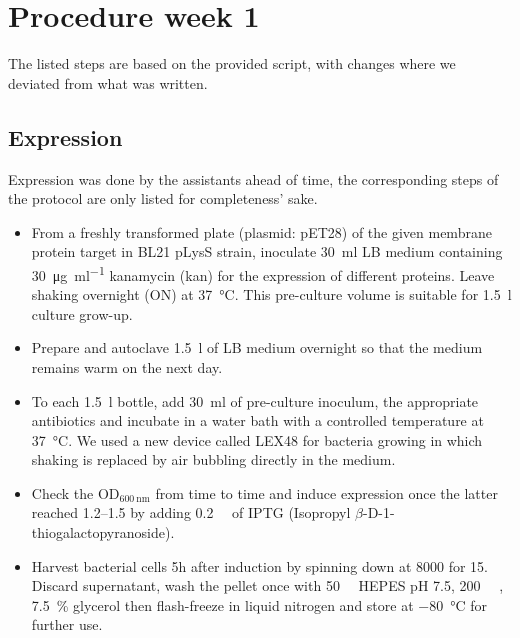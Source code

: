 \chapter{Procedure week 1\cite{skript_ballmoos}}

The listed steps are based on the provided script, with changes where we
deviated from what was written.

\section{Expression}

Expression was done by the assistants ahead of time, the corresponding steps of
the protocol are only listed for completeness' sake.

\begin{itemize}
	\item From a freshly transformed plate (plasmid: pET28) of the given
		membrane protein target in BL21 pLysS strain, inoculate
		\SI{30}{\ml} LB medium containing \SI{30}{\ug \per \ml}
		kanamycin (kan) for the expression of different proteins. Leave
		shaking overnight (ON) at \SI{37}{\celsius}. This pre-culture
		volume is suitable for \SI{1.5}{\l} culture grow-up.

	\item Prepare and autoclave \SI{1.5}{\l} of LB medium overnight so that
		the medium remains warm on the next day.

	\item To each \SI{1.5}{\l} bottle, add \SI{30}{\ml} of pre-culture
		inoculum, the appropriate antibiotics and incubate in a water
		bath with a controlled temperature at \SI{37}{\celsius}. We
		used a new device called LEX48 for bacteria growing in which
		shaking is replaced by air bubbling directly in the medium.

	\item Check the OD$_{\SI{600}{\nm}}$ from time to time and induce
		expression once the latter reached \numrange{1.2}{1.5} by adding
		\SI{0.2}{\milli\Molar} of IPTG (Isopropyl
		$\beta$-D-1-thiogalactopyranoside).

	\item Harvest bacterial cells 5h after induction by spinning down at
		\SI{8000}{\rpm} for \SI{15}{\min}. Discard supernatant, wash
		the pellet once with \SI{50}{\milli\Molar} HEPES pH 7.5,
		\SI{200}{\milli\Molar} , \SI{7.5}{\percent} glycerol
		then flash-freeze in liquid nitrogen and store at
		\SI{-80}{\celsius} for further use.
\end{itemize}

